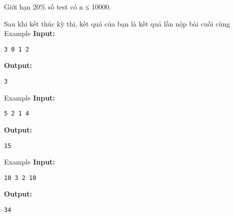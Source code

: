 Giới hạn
20\% số test có n ≤ 10000.  

     Sau khi kết thúc kỳ thi, kết quả của bạn là kết quả lần nộp bài cuối cùng
Example
\textbf{    Input:   }
\begin{verbatim}
3 0 1 2\end{verbatim}

\textbf{    Output:   }
\begin{verbatim}
3\end{verbatim}
Example
\textbf{    Input:   }
\begin{verbatim}
5 2 1 4\end{verbatim}

\textbf{    Output:   }
\begin{verbatim}
15\end{verbatim}
Example
\textbf{    Input:   }
\begin{verbatim}
10 3 2 10\end{verbatim}

\textbf{    Output:   }
\begin{verbatim}
34\end{verbatim}